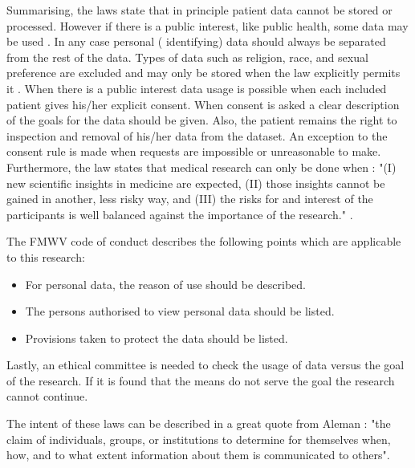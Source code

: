 Summarising, the laws state that in principle patient data cannot be stored or processed.
However if there is a public interest, like public health, some data may be used \cite{s19Mouw2012}.
In any case personal (\ie{} identifying) data should always be separated from the rest of the data.
Types of data such as religion, race, and sexual preference are excluded and may only be stored when the law explicitly permits it \cite{s19Mouw2012}.
When there is a public interest data usage is possible when each included patient gives his/her explicit consent.
When consent is asked a clear description of the goals for the data should be given.
Also, the patient remains the right to inspection and removal of his/her data from the dataset.
An exception to the consent rule is made when requests are impossible or unreasonable to make.
Furthermore, the law states that medical research can only be done when : "(I) new scientific insights in medicine are expected, (II) those insights cannot be gained in another, less risky way, and (III) the risks for and interest of the participants is well balanced against the importance of the research." \cite{s19Mouw2012}.

The FMWV code of conduct describes the following points which are applicable to this research:

\begin{itemize}
	\item For personal data, the reason of use should be described.
	\item The persons authorised to view personal data should be listed.
	\item Provisions taken to protect the data should be listed.
\end{itemize}

Lastly, an ethical committee is needed to check the usage of data versus the goal of the research.
If it is found that the means do not serve the goal the research cannot continue.

The intent of these laws can be described in a great quote from Aleman \cite{s8FernandezAleman2013}: "the claim of individuals, groups, or institutions to determine for themselves when, how, and to what extent information about them is communicated to others".